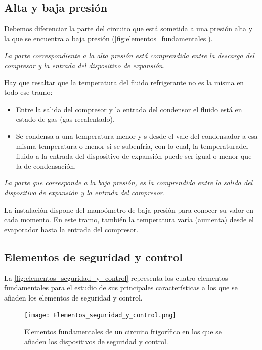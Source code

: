 \subsection{Alta y baja presión}

Debemos diferenciar la parte del circuito que está sometida a una presión alta y la que se encuentra a baja presión (\autoref{fig:elementos_fundamentales}).

\textit{La parte correspondiente a la alta presión está comprendida entre la descarga del compresor y la entrada del dispositivo de expansión.}

Hay que resaltar que la temperatura del fluido refrigerante no es la misma en todo ese tramo:

\begin{itemize}
	\item Entre la salida del compresor y la entrada del condensor el fluido está en estado de gas (gas recalentado).
	\item Se condensa a una temperatura menor y s desde el vale del condensador a esa misma temperatura o menor si se subenfría, con lo cual, la temperaturadel fluido a la entrada del dispositivo de expansión puede ser igual o menor que la de condensación.
\end{itemize}

\textit{La parte que corresponde a la baja presión, es la comprendida entre la salida del dispositivo de expansión y la entrada del compresor.}

La instalación dispone del manoómetro de baja presión para conocer su valor en cada momento. En este tramo, también la temperatura varía (aumenta) desde el evaporador hasta la entrada del compresor.

\subsection{Elementos de seguridad y control}

La \autoref{fig:elementos_seguridad_y_control} representa los cuatro elementos fundamentales para el estudio de sus principales características a los que se añaden los elementos de seguridad y control.

\begin{figure}[H]
	\centering
	\texttt{[image: Elementos\_seguridad\_y\_control.png]}
	\caption{Elementos fundamentales de un circuito frigorífico en los que se añaden los dispositivos de seguridad y control.}
	\label{fig:elementos_seguridad_y_control}
\end{figure}

